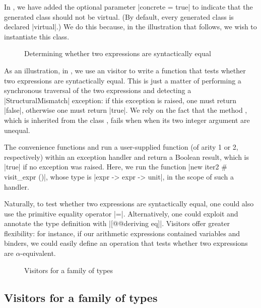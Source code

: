\documentclass[11pt,a4paper,twoside]{article}
\begin{document}
In , we have added the optional parameter
%
\oc|concrete = true|
%
to indicate that the generated class should not be virtual. (By default,
every generated class is declared \oc|virtual|.) We do this because, in
the illustration that follows, we wish to instantiate this class.

\begin{figure}[p]
\caption{Determining whether two expressions are syntactically equal}
\label{fig:expr05}
\end{figure}

As an illustration, in , we use an \itertwo visitor to write
a function that tests whether two expressions are syntactically equal. This is
just a matter of performing a synchronous traversal of the two expressions and
detecting a \oc|StructuralMismatch| exception: if this exception is raised,
one must return \oc|false|, otherwise one must return \oc|true|. We rely on
the fact that the method , which is inherited from the class
, fails when when its two integer argument are
unequal.

The convenience functions  and
 run a user-supplied function (of arity 1 or 2,
respectively) within an exception handler and return a Boolean result, which
is \oc|true| if no exception was raised. Here, we run the function
%
\oc|new iter2 # visit_expr ()|, whose type is \oc|expr -> expr -> unit|,
in the scope of such a handler.

Naturally, to test whether two expressions are syntactically equal, one could
also use the primitive equality operator \oc|=|. Alternatively, one could
exploit \ppxderiving and annotate the type definition with
%
\oc|[@@deriving eq]|. Visitors offer greater flexibility: for instance, if our
arithmetic expressions contained variables and binders, we could easily define
an operation that tests whether two expressions are $\alpha$-equivalent.


\begin{figure}[p]
\caption{Visitors for a family of types}
\label{fig:expr06}
\end{figure}

\subsection{Visitors for a family of types}
\label{sec:intro:family}
\end{document}
